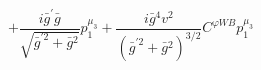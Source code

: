 %
\begin{dmath*}
%
  +  \frac{i {\bar g}^\prime {\bar g}{}}{\sqrt{{\bar g}^{\prime 2} + {\bar g}{}^2}}p_1^{\mu_3}  +  \frac{i {\bar g}{}^4 v^2}{\left({\bar g}^{\prime 2} + {\bar g}{}^2\right)^{3/2}}C^{ \varphi  WB} p_1^{\mu_3}
%
\end{dmath*}
%
